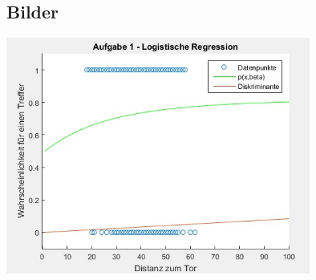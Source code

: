 \documentclass[12pt]{article}
\begin{document}
\subsection{Bilder}

\begin{center}
\includegraphics[width=10cm]{plot.jpg}
\end{center}
\end{document}
